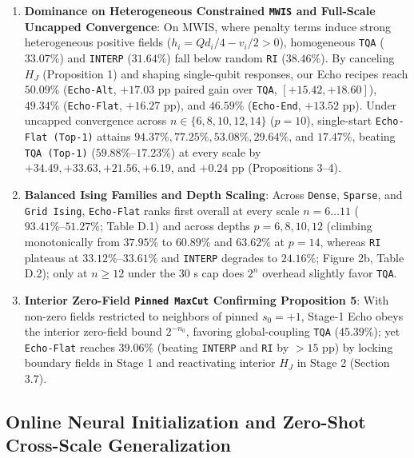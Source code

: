 \documentclass{article}
\theoremstyle{plain}
\theoremstyle{definition}
\begin{document}
\begin{enumerate}\setlength{\itemsep}{0pt}\setlength{\parskip}{1pt}\setlength{\topsep}{1pt}
\item \textbf{Dominance on Heterogeneous Constrained \texttt{MWIS} and Full-Scale Uncapped Convergence}: On MWIS, where penalty terms induce strong heterogeneous positive fields ($h_i=Qd_i/4-v_i/2>0$), homogeneous \texttt{TQA} ($33.07\%$) and \texttt{INTERP} ($31.64\%$) fall below random \texttt{RI} ($38.46\%$). By canceling $H_J$ (Proposition 1) and shaping single-qubit responses, our Echo recipes reach $\mathbf{50.09}\%$ (\texttt{Echo-Alt}, $+17.03$ pp paired gain over \texttt{TQA}, $[+15.42, +18.60]$), $49.34\%$ (\texttt{Echo-Flat}, $+16.27$ pp), and $46.59\%$ (\texttt{Echo-End}, $+13.52$ pp). Under uncapped convergence across $n\in\{6,8,10,12,14\}$ ($p=10$), single-start \texttt{Echo-Flat (Top-1)} attains $\mathbf{94.37}\%, \mathbf{77.25}\%, \mathbf{53.08}\%, \mathbf{29.64}\%$, and $\mathbf{17.47}\%$, beating \texttt{TQA (Top-1)} ($59.88\%\text{--}17.23\%$) at every scale by $+34.49, +33.63, +21.56, +6.19$, and $+0.24$ pp (Propositions 3--4).
\item \textbf{Balanced Ising Families and Depth Scaling}: Across \texttt{Dense}, \texttt{Sparse}, and \texttt{Grid Ising}, \texttt{Echo-Flat} ranks first overall at every scale $n=6\ldots 11$ ($\mathbf{93.41}\%\text{--}\mathbf{51.27}\%$; Table D.1) and across depths $p=6,8,10,12$ (climbing monotonically from $\mathbf{37.95}\%$ to $\mathbf{60.89}\%$ and $63.62\%$ at $p=14$, whereas \texttt{RI} plateaus at $33.12\%\text{--}33.61\%$ and \texttt{INTERP} degrades to $24.16\%$; Figure 2b, Table D.2); only at $n\ge 12$ under the 30 s cap does $2^n$ overhead slightly favor \texttt{TQA}.
\item \textbf{Interior Zero-Field \texttt{Pinned MaxCut} Confirming Proposition 5}: With non-zero fields restricted to neighbors of pinned $s_0=+1$, Stage-1 Echo obeys the interior zero-field bound $2^{-n_0}$, favoring global-coupling \texttt{TQA} ($\mathbf{45.39}\%$); yet \texttt{Echo-Flat} reaches $39.06\%$ (beating \texttt{INTERP} and \texttt{RI} by $>15$ pp) by locking boundary fields in Stage 1 and reactivating interior $H_J$ in Stage 2 (Section 3.7).

\end{enumerate}
\subsection{Online Neural Initialization and Zero-Shot Cross-Scale Generalization}\label{subsec:5_3}
\end{document}
